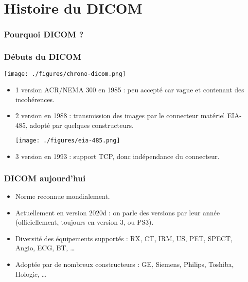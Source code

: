 \section{Histoire du DICOM}

	\frame
	{
		\frametitle{Pourquoi DICOM ?}
		
	}
					
	\frame
	{
		\frametitle{D\'ebuts du DICOM}
		\texttt{[image: ./figures/chrono-dicom.png]}

		\begin{itemize}
			\item 1 version ACR/NEMA 300 en 1985 : peu accept\'e car vague et contenant des incoh\'erences.
			\item 2 version en 1988 : transmission des images par le connecteur mat\'eriel EIA-485, adopt\'e par quelques constructeurs.

		        \texttt{[image: ./figures/eia-485.png]}
			\item 3 version en 1993 : support TCP, donc ind\'ependance du connecteur.
		\end{itemize}
	}
	
	\frame
	{
		\frametitle{DICOM aujourd'hui}
		\begin{itemize}
			\item Norme reconnue mondialement.
			\item Actuellement en version $2020$d : on parle des versions par leur ann\'ee (officiellement, toujours en version 3, ou PS3).
			\item Diversit\'e des \'equipements support\'es : RX, CT, IRM, US, PET, SPECT, Angio, ECG, BT, \ldots
			\item Adopt\'ee par de nombreux constructeurs : GE, Siemens, Philips, Toshiba, Hologic, \ldots
		\end{itemize}
	}
